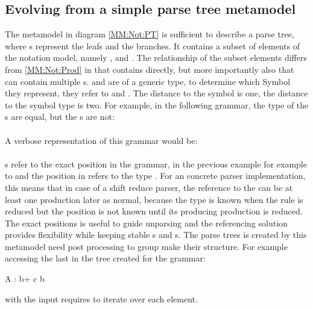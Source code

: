 \subsection{Evolving from a simple parse tree metamodel}The metamodel in diagram \ref{MM:Not:PT} is sufficient to describe a parse tree, where s represent the leafs and  the branches. It contains a subset of elements of the notation model, namely ,  and . The relationship of the subset elements differs from \ref{MM:Not:Prod} in that  contains  directly, but more importantly also that  can contain multiple s.  and  are of a generic type, to determine which Symbol they represent, they refer to  and . The distance to the symbol is one, the distance to the symbol type is two. 
For example, in the following grammar, the type of the s are equal, but the s are not:\\
 \\
A verbose representation of this grammar would be: \\
 \\
s refer to the exact position in the grammar, in the previous example for example to  and the position in refers to the type . For an concrete parser implementation, this means that in case of a shift reduce parser, the reference to the  can be at least one production later as normal, because the type is known when the rule is reduced but the position is not known until its producing production is reduced. The exact positions is useful to guide unparsing and the referencing solution provides flexibility while keeping stable s and s. The parse trees is created by this metamodel need post processing to group make their structure. For example accessing the last  in the tree created for the grammar:\\
\begin{xtxt}
A : b+ c b 
\end{xtxt}
with the input  requires to iterate over each element. 

